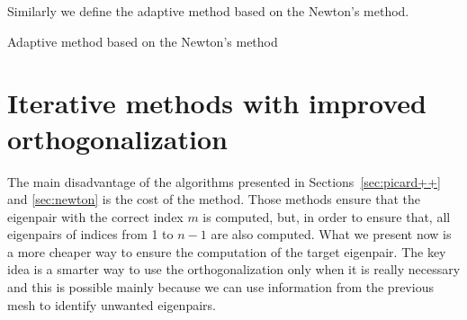 \documentclass[preprint,12pt]{elsarticle}
\begin{document}
Similarly we define the adaptive method based on the Newton's method.

\begin{algorithm}[H] \caption{Adaptive method based on the Newton's method} \label{alg:newton_adapt} 
\begin{algorithmic}



\REPEAT
{}



\ENDFOR
{}
\end{algorithmic}
\end{algorithm}

\section{Iterative methods with improved orthogonalization}\label{sec:imp_ortho}

The main disadvantage of the algorithms presented in Sections~\ref{sec:picard++} and \ref{sec:newton} is the cost of the method. Those methods ensure that the eigenpair with the correct index $m$ is computed, but, in order to ensure that, all eigenpairs of indices from 1 to $n-1$ are also computed. What we present now is a more cheaper way to ensure the computation of the target eigenpair. The key idea is a smarter way to use the orthogonalization only when it is really necessary and this is possible mainly because we can use information from the previous mesh to identify unwanted eigenpairs.
\end{document}
